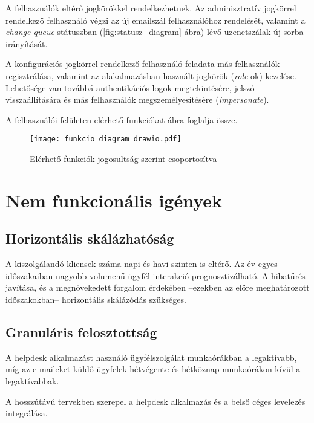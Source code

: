 A felhasználók eltérő jogkörökkel rendelkezhetnek. Az adminisztratív jogkörrel rendelkező felhasználó végzi az új emailszál felhasználóhoz rendelését, valamint a \foreignlanguage{british}{\textit{change queue}} státuszban (\ref{fig:statusz_diagram} ábra) lévő üzenetszálak új sorba irányítását.

A konfigurációs jogkörrel rendelkező felhasználó feladata más felhasználók regisztrálása, valamint az alakalmazásban használt jogkörök (\foreignlanguage{british}{\textit{role}}-ok) kezelése. Lehetősége van továbbá authentikációs logok megtekintésére, jelszó visszaállítására és más felhasználók megszemélyesítésére (\foreignlanguage{british}{\textit{impersonate}}).

A felhasználói felületen elérhető funkciókat  ábra foglalja össze.

\begin{figure}[hbt] 
	\centering
	\texttt{[image: funkcio\_diagram\_drawio.pdf]}
	\caption[Elérhető funkciók]{Elérhető funkciók jogosultság szerint csoportosítva}
	\label{fig:funkcio_diagram}
\end{figure}


\section{Nem funkcionális igények}	


\subsection[Skálázhatóság]{Horizontális skálázhatóság}
A kiszolgálandó kliensek száma napi és havi szinten is eltérő. Az év egyes időszakaiban nagyobb volumenű ügyfél-interakció prognosztizálható. A hibatűrés javítása, és a megnövekedett forgalom érdekében --ezekben az előre meghatározott időszakokban-- horizontális skálázódás szükséges.


\subsection{Granuláris felosztottság}\label{sec:granularitas}
A \foreignlanguage{british}{helpdesk} alkalmazást használó ügyfélszolgálat munkaórákban a legaktívabb, míg az e-maileket küldő ügyfelek hétvégente és hétköznap munkaórákon kívül a legaktívabbak.

A hosszútávú tervekben szerepel a \foreignlanguage{british}{helpdesk} alkalmazás és a belső céges levelezés integrálása.

